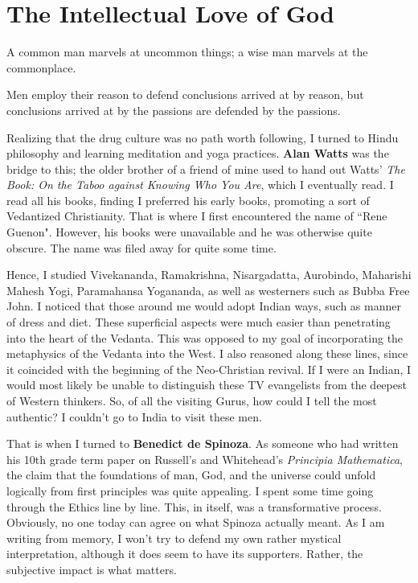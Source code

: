 \section{The Intellectual Love of God}

\begin{quotex}
A common man marvels at uncommon things; a wise man marvels at the commonplace. 

Men employ their reason to defend conclusions arrived at by reason, but conclusions arrived at by the passions are defended by the passions. 

\end{quotex}
Realizing that the drug culture was no path worth following, I turned to Hindu philosophy and learning meditation and yoga practices. \textbf{Alan Watts} was the bridge to this; the older brother of a friend of mine used to hand out Watts' \textit{The Book: On the Taboo against Knowing Who You Are}, which I eventually read. I read all his books, finding I preferred his early books, promoting a sort of Vedantized Christianity. That is where I first encountered the name of ``Rene Guenon". However, his books were unavailable and he was otherwise quite obscure. The name was filed away for quite some time.

Hence, I studied Vivekananda, Ramakrishna, Nisargadatta, Aurobindo, Maharishi Mahesh Yogi, Paramahansa Yogananda, as well as westerners such as Bubba Free John. I noticed that those around me would adopt Indian ways, such as manner of dress and diet. These superficial aspects were much easier than penetrating into the heart of the Vedanta. This was opposed to my goal of incorporating the metaphysics of the Vedanta into the West. I also reasoned along these lines, since it coincided with the beginning of the Neo-Christian revival. If I were an Indian, I would most likely be unable to distinguish these TV evangelists from the deepest of Western thinkers. So, of all the visiting Gurus, how could I tell the most authentic? I couldn't go to India to visit these men.

That is when I turned to \textbf{Benedict de Spinoza}. As someone who had written his 10th grade term paper on Russell's and Whitehead's \textit{Principia Mathematica}, the claim that the foundations of man, God, and the universe could unfold logically from first principles was quite appealing. I spent some time going through the Ethics line by line. This, in itself, was a transformative process. Obviously, no one today can agree on what Spinoza actually meant. As I am writing from memory, I won't try to defend my own rather mystical interpretation, although it does seem to have its supporters. Rather, the subjective impact is what matters.

